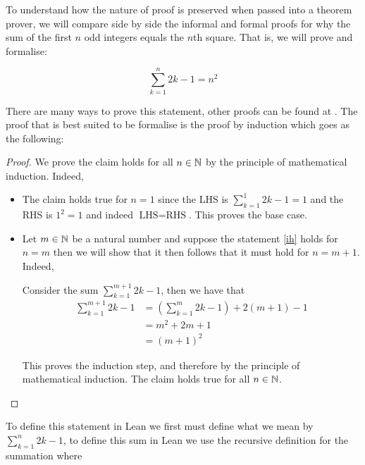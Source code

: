 \begin{example}
    To understand how the nature of proof is preserved when passed into a theorem prover, we will compare side by side the informal and formal proofs 
    for why the sum of the first $n$ odd integers equals the $n$th square. That is, we will prove and formalise:

    \begin{equation}
        \label{ih}
        \sum_{k = 1}^{n} 2k - 1 = n^2
    \end{equation}

    There are many ways to prove this statement, other proofs can be found at \cite{sangwin}. The proof that is best suited to be formalise is the
    proof by induction which goes as the following:

    \begin{proof}
        We prove the claim holds for all $n \in \mathbb{N}$ by the principle of mathematical induction. Indeed,

        \begin{itemize}
            \item The claim holds true for $n = 1$ since the LHS is $\sum_{k = 1}^{1} 2k -1 = 1$ and the RHS is $1^2 = 1$ and indeed $\textrm{LHS} = \textrm{RHS}$. This proves the base case.
            
            \item Let $m \in \mathbb{N}$ be a natural number and suppose the statement \eqref{ih} holds for $n = m$ then we will show that it then follows that it must hold for $n = m + 1$. Indeed,
            
            Consider the sum $\sum_{k = 1}^{m + 1} 2k - 1$, then we have that
            \begin{align}
                \sum_{k = 1}^{m + 1} 2k - 1 &= \left(\sum_{k = 1}^{m} 2k - 1\right) + 2(m + 1) - 1 \tag{by definition of the summation}\\
                    &=  m^2 + 2m + 1 \tag{by the induction hypothesis}\\
                    &= (m + 1)^2
            \end{align}

            This proves the induction step, and therefore by the principle of mathematical induction. The claim holds true for all $n \in \mathbb{N}$.
        \end{itemize}
    \end{proof}

    To define this statement in Lean we first must define what we mean by $\sum_{k = 1}^{n} 2k - 1$, to define this sum in Lean we use the recursive definition
    for the summation where 


\end{example}
